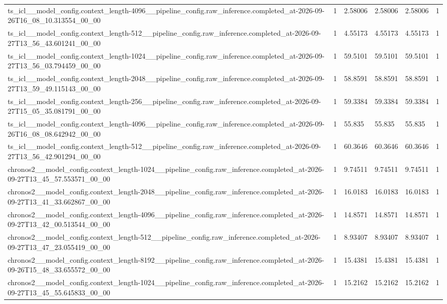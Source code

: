 \begin{tabular}{llllll}
ts\_icl\_\_model\_config.context\_length-4096\_\_pipeline\_config.raw\_inference.completed\_at-2026-09-26T16\_08\_10.313554\_00\_00 & 1 & 2.58006 & 2.58006 & 2.58006 & 1 \\
ts\_icl\_\_model\_config.context\_length-512\_\_pipeline\_config.raw\_inference.completed\_at-2026-09-27T13\_56\_43.601241\_00\_00 & 1 & 4.55173 & 4.55173 & 4.55173 & 1 \\
ts\_icl\_\_model\_config.context\_length-1024\_\_pipeline\_config.raw\_inference.completed\_at-2026-09-27T13\_56\_03.794459\_00\_00 & 1 & 59.5101 & 59.5101 & 59.5101 & 1 \\
ts\_icl\_\_model\_config.context\_length-2048\_\_pipeline\_config.raw\_inference.completed\_at-2026-09-27T13\_59\_49.115143\_00\_00 & 1 & 58.8591 & 58.8591 & 58.8591 & 1 \\
ts\_icl\_\_model\_config.context\_length-256\_\_pipeline\_config.raw\_inference.completed\_at-2026-09-27T15\_05\_35.081791\_00\_00 & 1 & 59.3384 & 59.3384 & 59.3384 & 1 \\
ts\_icl\_\_model\_config.context\_length-4096\_\_pipeline\_config.raw\_inference.completed\_at-2026-09-26T16\_08\_08.642942\_00\_00 & 1 & 55.835 & 55.835 & 55.835 & 1 \\
ts\_icl\_\_model\_config.context\_length-512\_\_pipeline\_config.raw\_inference.completed\_at-2026-09-27T13\_56\_42.901294\_00\_00 & 1 & 60.3646 & 60.3646 & 60.3646 & 1 \\
chronos2\_\_model\_config.context\_length-1024\_\_pipeline\_config.raw\_inference.completed\_at-2026-09-27T13\_45\_57.553571\_00\_00 & 1 & 9.74511 & 9.74511 & 9.74511 & 1 \\
chronos2\_\_model\_config.context\_length-2048\_\_pipeline\_config.raw\_inference.completed\_at-2026-09-27T13\_41\_33.662867\_00\_00 & 1 & 16.0183 & 16.0183 & 16.0183 & 1 \\
chronos2\_\_model\_config.context\_length-4096\_\_pipeline\_config.raw\_inference.completed\_at-2026-09-27T13\_42\_00.513544\_00\_00 & 1 & 14.8571 & 14.8571 & 14.8571 & 1 \\
chronos2\_\_model\_config.context\_length-512\_\_pipeline\_config.raw\_inference.completed\_at-2026-09-27T13\_47\_23.055419\_00\_00 & 1 & 8.93407 & 8.93407 & 8.93407 & 1 \\
chronos2\_\_model\_config.context\_length-8192\_\_pipeline\_config.raw\_inference.completed\_at-2026-09-26T15\_48\_33.655572\_00\_00 & 1 & 15.4381 & 15.4381 & 15.4381 & 1 \\
chronos2\_\_model\_config.context\_length-1024\_\_pipeline\_config.raw\_inference.completed\_at-2026-09-27T13\_45\_55.645833\_00\_00 & 1 & 15.2162 & 15.2162 & 15.2162 & 1 \\

\end{tabular}
